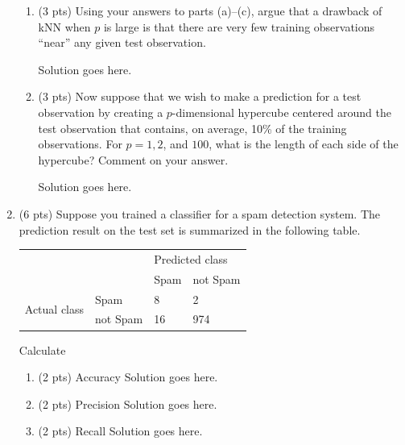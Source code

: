 \documentclass[a4paper]{article}
\theoremstyle{definition}
\newenvironment{soln}{
    \leavevmode\color{blue}\ignorespaces
}{}
\begin{document}
\begin{enumerate}
\begin{enumerate}
	\item (3 pts) Using your answers to parts (a)–(c), argue that a drawback of kNN when $p$ is large is that there are very few training observations “near” any given test observation.
	
	\begin{soln}  Solution goes here. \end{soln}
	
	\item (3 pts) Now suppose that we wish to make a prediction for a test observation by creating a $p$-dimensional hypercube centered around the test observation that contains, on average, 10\% of the training observations. For $p =1, 2$, and $100$, what is the length of each side of the hypercube? Comment on your answer.
	
	\begin{soln}  Solution goes here. \end{soln}
	
\end{enumerate}

\item (6 pts) Suppose you trained a classifier for a spam detection system. The prediction result on the test set is summarized in the following table.
\begin{center}
	\begin{tabular}{l l | l l}
		&          & \multicolumn{2}{l}{Predicted class} \\
		&          & Spam           & not Spam           \\
		\hline
		\multirow{2}{*}{Actual class} & Spam     & 8              & 2                  \\
		& not Spam & 16             & 974               
	\end{tabular}
\end{center}

Calculate
\begin{enumerate}
	\item (2 pts) Accuracy
	\begin{soln}  Solution goes here. \end{soln}
	\item (2 pts) Precision
	\begin{soln}  Solution goes here. \end{soln}
	\item (2 pts) Recall
	\begin{soln}  Solution goes here. \end{soln}
\end{enumerate}



\end{enumerate}
\end{document}
